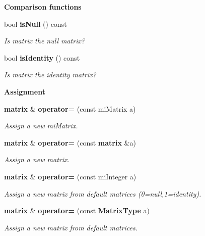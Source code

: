 \begin{Indent}{\bf Comparison functions}\par
\begin{CompactItemize}
\item 
bool {\bf is\-Null} () const 
\begin{CompactList}\small\item\em Is matrix the null matrix? \item\end{CompactList}\item 
bool {\bf is\-Identity} () const 
\begin{CompactList}\small\item\em Is matrix the identity matrix? \item\end{CompactList}\end{CompactItemize}
\end{Indent}
\begin{Indent}{\bf Assignment}\par
\begin{CompactItemize}
\item 
{\bf matrix} \& {\bf operator=} (const mi\-Matrix a)
\begin{CompactList}\small\item\em Assign a new mi\-Matrix. \item\end{CompactList}\item 
{\bf matrix} \& {\bf operator=} (const {\bf matrix} \&a)
\begin{CompactList}\small\item\em Assign a new matrix. \item\end{CompactList}\item 
{\bf matrix} \& {\bf operator=} (const mi\-Integer a)
\begin{CompactList}\small\item\em Assign a new matrix from default matrices (0=null,1=identity). \item\end{CompactList}\item 
{\bf matrix} \& {\bf operator=} (const {\bf Matrix\-Type} a)
\begin{CompactList}\small\item\em Assign a new matrix from default matrices. \item\end{CompactList}\end{CompactItemize}
\end{Indent}
